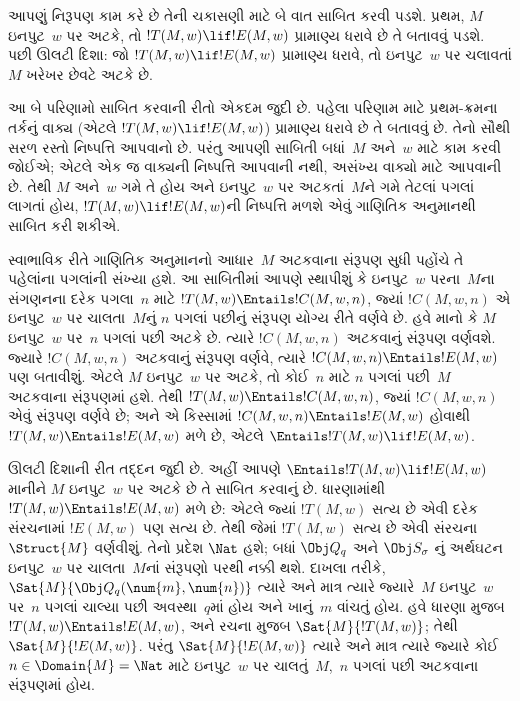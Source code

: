 \begin{explain}
આપણું નિરૂપણ કામ કરે છે તેની ચકાસણી માટે બે વાત
સાબિત કરવી પડશે. પ્રથમ, $M$ ઇનપુટ~$w$ પર અટકે,
તો $!T(M, w) \lif !E(M, w)$ પ્રામાણ્ય ધરાવે છે તે
બતાવવું પડશે. પછી ઊલટી દિશા: જો
$!T(M, w) \lif !E(M, w)$ પ્રામાણ્ય ધરાવે, તો
ઇનપુટ~$w$ પર ચલાવતાં $M$ ખરેખર છેવટે અટકે છે.

આ બે પરિણામો સાબિત કરવાની રીતો એકદમ જુદી છે.
પહેલા પરિણામ માટે પ્રથમ-ક્રમના તર્કનું વાક્ય
(એટલે $!T(M, w) \lif !E(M, w)$) પ્રામાણ્ય ધરાવે છે
તે બતાવવું છે. તેનો સૌથી સરળ રસ્તો નિષ્પત્તિ
આપવાનો છે. પરંતુ આપણી સાબિતી બધાં~$M$ અને~$w$
માટે કામ કરવી જોઈએ; એટલે એક જ વાક્યની
નિષ્પત્તિ આપવાની નથી, અસંખ્ય વાક્યો માટે
આપવાની છે. તેથી $M$ અને~$w$ ગમે તે હોય અને
ઇનપુટ~$w$ પર અટકતાં~$M$ને ગમે તેટલાં પગલાં લાગતાં
હોય, $!T(M, w) \lif !E(M, w)$ની નિષ્પત્તિ
મળશે એવું ગાણિતિક અનુમાનથી સાબિત કરી શકીએ.

સ્વાભાવિક રીતે ગાણિતિક અનુમાનનો આધાર~$M$ અટકવાના સંરૂપણ
સુધી પહોંચે તે પહેલાંના પગલાંની સંખ્યા હશે. આ
સાબિતીમાં આપણે સ્થાપીશું કે ઇનપુટ~$w$ પરના~$M$ના
સંગણનના દરેક પગલા~$n$ માટે
$!T(M, w) \Entails !C(M, w, n)$, જ્યાં
$!C(M, w, n)$ એ ઇનપુટ~$w$ પર ચાલતા~$M$નું
$n$ પગલાં પછીનું સંરૂપણ યોગ્ય રીતે વર્ણવે છે.
હવે માનો કે $M$ ઇનપુટ~$w$
પર~$n$ પગલાં પછી અટકે છે. ત્યારે
$!C(M, w, n)$ અટકવાનું સંરૂપણ વર્ણવશે. જ્યારે
$!C(M, w, n)$ અટકવાનું સંરૂપણ વર્ણવે, ત્યારે
$!C(M, w, n) \Entails !E(M, w)$ પણ બતાવીશું.
  એટલે $M$ ઇનપુટ~$w$ પર અટકે, તો કોઈ~$n$ માટે
$n$ પગલાં પછી~$M$ અટકવાના સંરૂપણમાં હશે. તેથી
$!T(M, w) \Entails !C(M, w, n)$, જ્યાં
$!C(M, w, n)$ એવું સંરૂપણ વર્ણવે છે; અને એ કિસ્સામાં
$!C(M, w, n) \Entails !E(M, w)$ હોવાથી
$!T(M, w) \Entails !E(M, w)$ મળે છે, એટલે
$\Entails !T(M, w) \lif !E(M, w)$.

ઊલટી દિશાની રીત તદ્દન જુદી છે. અહીં આપણે
$\Entails !T(M, w) \lif !E(M, w)$ માનીને
$M$ ઇનપુટ~$w$ પર અટકે છે તે સાબિત કરવાનું છે.
ધારણામાંથી $!T(M, w) \Entails !E(M, w)$ મળે છે:
એટલે જ્યાં $!T(M, w)$ સત્ય છે એવી દરેક
સંરચનામાં $!E(M, w)$ પણ સત્ય છે. તેથી
જેમાં $!T(M, w)$ સત્ય છે એવી
સંરચના~$\Struct{M}$ વર્ણવીશું. તેનો પ્રદેશ
$\Nat$ હશે; બધાં $\Obj Q_q$ અને $\Obj S_\sigma$
નું અર્થઘટન ઇનપુટ~$w$ પર ચાલતા~$M$નાં
સંરૂપણો પરથી નક્કી થશે. દાખલા તરીકે,
$\Sat{M}{\Obj Q_q(\num{m}, \num{n})}$ ત્યારે અને માત્ર
ત્યારે જ્યારે~$M$ ઇનપુટ~$w$ પર~$n$ પગલાં ચાલ્યા
પછી અવસ્થા~$q$માં હોય અને ખાનું~$m$ વાંચતું હોય.
હવે ધારણા મુજબ $!T(M, w) \Entails !E(M, w)$,
અને રચના મુજબ $\Sat{M}{!T(M, w)}$;
તેથી $\Sat{M}{!E(M, w)}$. પરંતુ
$\Sat{M}{!E(M, w)}$ ત્યારે અને માત્ર ત્યારે જ્યારે
કોઈ $n \in \Domain{M} = \Nat$ માટે ઇનપુટ~$w$
પર ચાલતું~$M$,~$n$ પગલાં પછી અટકવાના
સંરૂપણમાં હોય.
\end{explain}

